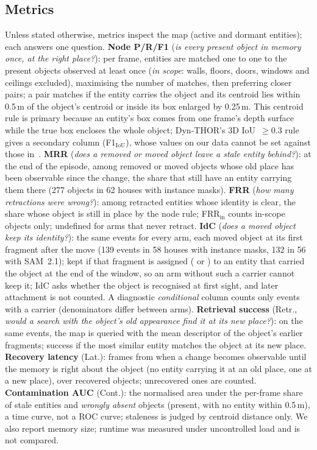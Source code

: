 \subsection{Metrics}
\label{sec:metrics}
Unless stated otherwise, metrics inspect the map (active and dormant entities); each answers one question.
\textbf{Node P/R/F1} (\emph{is every present object in memory once, at the right place?}): per frame, entities are matched one to one to the present objects observed at least once (\emph{in scope}: walls, floors, doors, windows and ceilings excluded), maximising the number of matches, then preferring closer pairs; a pair matches if the entity carries the object and its centroid lies within 0.5\,m of the object's centroid or inside its box enlarged by 0.25\,m.
This centroid rule is primary because an entity's box comes from one frame's depth surface while the true box encloses the whole object; Dyn-THOR's 3D IoU~$\geq 0.3$ rule~\cite{dsg2026} gives a secondary column (F1$_\mathrm{IoU}$), whose values on our data cannot be set against those in~\cite{dsg2026}.
\textbf{MRR} (\emph{does a removed or moved object leave a stale entity behind?}): at the end of the episode, among removed or moved objects whose old place has been observable since the change, the share that still have an entity carrying them there (277 objects in 62 houses with instance masks).
\textbf{FRR} (\emph{how many retractions were wrong?}): among retracted entities whose identity is clear, the share whose object is still in place by the node rule; FRR$_\mathrm{in}$ counts in-scope objects only; undefined for arms that never retract.
\textbf{IdC} (\emph{does a moved object keep its identity?}): the same events for every arm, each moved object at its first fragment after the move (139 events in 58 houses with instance masks, 132 in 56 with SAM~2.1); kept if that fragment is assigned ( or ) to an entity that carried the object at the end of the window, so an arm without such a carrier cannot keep it; IdC asks whether the object is recognised at first sight, and later attachment is not counted. A diagnostic \emph{conditional} column counts only events with a carrier (denominators differ between arms).
\textbf{Retrieval success} (Retr., \emph{would a search with the object's old appearance find it at its new place?}): on the same events, the map is queried with the mean descriptor of the object's earlier fragments; success if the most similar entity matches the object at its new place.
\textbf{Recovery latency} (Lat.): frames from when a change becomes observable until the memory is right about the object (no entity carrying it at an old place, one at a new place), over recovered objects; unrecovered ones are counted.
\textbf{Contamination AUC} (Cont.): the normalised area under the per-frame share of stale entities and \emph{wrongly absent} objects (present, with no entity within 0.5\,m), a time curve, not a ROC curve; staleness is judged by centroid distance only.
We also report memory size; runtime was measured under uncontrolled load and is not compared.

